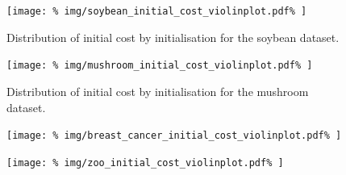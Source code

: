 \begin{table}
    \centering
    \resizebox{\textwidth}{!}{%
        
    }
    \label{tab:soybean_summary}\vspace{20pt}

    \resizebox{\textwidth}{!}{%
        
    }
    \label{tab:mushroom_summary}\vspace{20pt}

    \resizebox{\textwidth}{!}{%
        
    }
    \label{tab:breast_cancer_summary}\vspace{20pt}

    \resizebox{\textwidth}{!}{%
        
    }
    \label{tab:zoo_summary}
\end{table}

\begin{figure}
    \centering
    \texttt{[image: \%
        img/soybean\_initial\_cost\_violinplot.pdf\%
    ]}\caption{Distribution of initial cost by initialisation for the soybean
              dataset.}
\end{figure}

\begin{figure}
    \centering
    \texttt{[image: \%
        img/mushroom\_initial\_cost\_violinplot.pdf\%
    ]}\caption{Distribution of initial cost by initialisation for the mushroom
              dataset.}
\end{figure}

\begin{figure}
    \centering
    \texttt{[image: \%
        img/breast\_cancer\_initial\_cost\_violinplot.pdf\%
    ]}
\end{figure}

\begin{figure}
    \centering
    \texttt{[image: \%
        img/zoo\_initial\_cost\_violinplot.pdf\%
    ]}
\end{figure}
